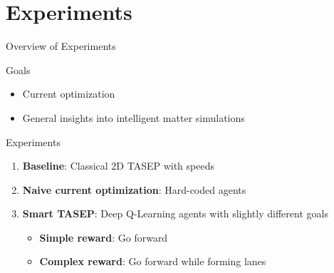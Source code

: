 \documentclass[10pt,xcolor=table, aspectratio=1610]{beamer}
\begin{document}
\section{Experiments}
\begin{frame}{Overview of Experiments}
  \begin{block}{Goals}
    \begin{itemize}
      \item Current optimization
      \item General insights into intelligent matter simulations  
    \end{itemize}
  \end{block}
  \begin{block}{Experiments}
  \begin{enumerate}
    \item \textbf{Baseline}: Classical 2D TASEP with speeds
    \item \textbf{Naive current optimization}: Hard-coded agents
    \item \textbf{Smart TASEP}: Deep Q-Learning agents with slightly different goals
    \begin{itemize}
      \item \textbf{Simple reward}: Go forward
      \item \textbf{Complex reward}: Go forward while forming lanes
    \end{itemize}
  \end{enumerate}
  \end{block}
\end{frame}
\end{document}
